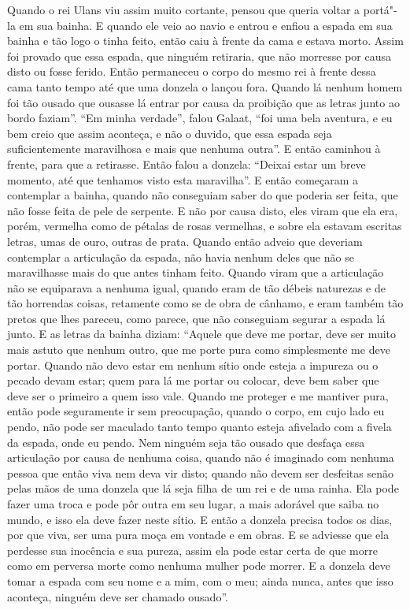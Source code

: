 Quando o rei Ulans viu assim muito cortante, pensou que queria voltar a portá"-la
em sua bainha. E quando ele veio ao navio e entrou e enfiou a espada em sua
bainha e tão logo o tinha feito, então caiu à frente da cama e estava morto.
Assim foi provado que essa espada, que ninguém retiraria, que não morresse por
causa disto ou fosse ferido. Então permaneceu o corpo do mesmo rei à frente
dessa cama tanto tempo até que uma donzela o lançou fora. Quando lá nenhum
homem foi tão ousado que ousasse lá entrar por causa da proibição que as letras
junto ao bordo faziam”. “Em minha verdade”, falou Galaat, “foi
uma bela aventura, e eu bem creio que assim aconteça, e não o duvido, que essa
espada seja suficientemente maravilhosa e mais que nenhuma outra”. E então
caminhou à frente, para que a retirasse. Então falou a donzela: “Deixai estar
um breve momento, até que tenhamos visto esta maravilha”. E então começaram a
contemplar a bainha, quando não conseguiam saber do que poderia ser feita, que
não fosse feita de pele de serpente. E não por causa disto, eles viram que ela
era, porém, vermelha como de pétalas de rosas vermelhas, e sobre ela estavam
escritas letras, umas de ouro, outras de prata. Quando então adveio que
deveriam contemplar a articulação da espada, não havia nenhum deles que não se
maravilhasse mais do que antes tinham feito. Quando viram que a articulação não
se equiparava a nenhuma igual, quando eram de tão débeis naturezas e de tão
horrendas coisas, retamente como se de obra de cânhamo, e eram também tão
pretos que lhes pareceu, como parece, que não conseguiam segurar a espada lá
junto. E as letras da bainha diziam: “Aquele que deve me portar, deve ser muito
mais astuto que nenhum outro, que me porte pura como simplesmente me deve
portar. Quando não devo estar em nenhum sítio onde esteja a impureza ou o
pecado devam estar; quem para lá me portar ou colocar, deve bem saber que deve
ser o primeiro a quem isso vale. Quando me proteger e me mantiver pura, então
pode seguramente ir sem preocupação, quando o corpo, em cujo lado eu pendo, não
pode ser maculado tanto tempo quanto esteja afivelado com a fivela da espada,
onde eu pendo. Nem ninguém seja tão ousado que desfaça essa articulação por
causa de nenhuma coisa, quando não é imaginado com nenhuma pessoa que então
viva nem deva vir disto; quando não devem ser desfeitas senão pelas mãos de uma
donzela que lá seja filha de um rei e de uma rainha. Ela pode fazer uma troca e
pode pôr outra em seu lugar, a mais adorável que saiba no mundo, e isso ela
deve fazer neste sítio. E então a donzela precisa todos os dias, por que viva,
ser uma pura moça em vontade e em obras. E se adviesse que ela perdesse sua
inocência e sua pureza, assim ela pode estar certa de que morre como em
perversa morte como nenhuma mulher pode morrer. E a donzela deve tomar a espada
com seu nome e a mim, com o meu; ainda nunca, antes que isso aconteça, ninguém
deve ser chamado ousado”. 


